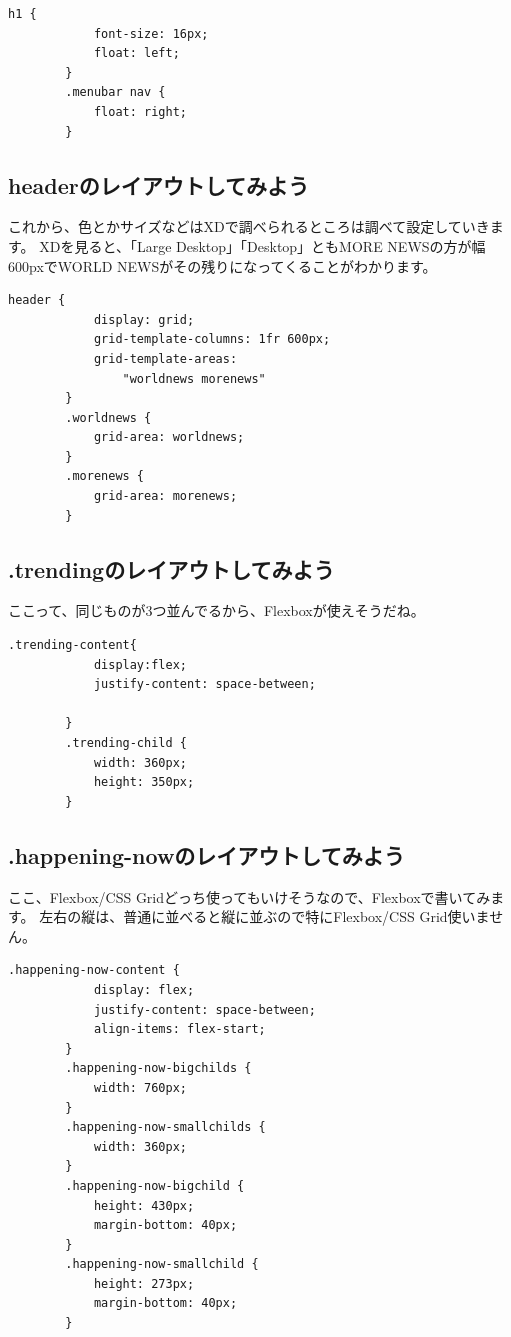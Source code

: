 \documentclass[mingoth,11pt,a4j,uplatex,dvipdfmx]{jsarticle}
\begin{document}
\begin{lstlisting}[caption=.menubarのレイアウト]
        h1 {
            font-size: 16px;
            float: left;
        }
        .menubar nav {
            float: right;
        }
\end{lstlisting}

\subsection{headerのレイアウトしてみよう}
これから、色とかサイズなどはXDで調べられるところは調べて設定していきます。
XDを見ると、「Large Desktop」「Desktop」ともMORE NEWSの方が幅600pxでWORLD NEWSがその残りになってくることがわかります。


\begin{lstlisting}[caption=headerのレイアウト]
        header {
            display: grid;
            grid-template-columns: 1fr 600px;
            grid-template-areas:
                "worldnews morenews"
        }
        .worldnews {
            grid-area: worldnews;
        }
        .morenews {
            grid-area: morenews;
        }
\end{lstlisting}

\subsection{.trendingのレイアウトしてみよう}
ここって、同じものが3つ並んでるから、Flexboxが使えそうだね。

\begin{lstlisting}[caption=.trendingのレイアウト]
        .trending-content{
            display:flex;
            justify-content: space-between;

        }
        .trending-child {
            width: 360px;
            height: 350px;
        }
\end{lstlisting}

\subsection{.happening-nowのレイアウトしてみよう}
ここ、Flexbox/CSS Gridどっち使ってもいけそうなので、Flexboxで書いてみます。
左右の縦は、普通に並べると縦に並ぶので特にFlexbox/CSS Grid使いません。

\begin{lstlisting}[caption=.happening-nowのレイアウト]
        .happening-now-content {
            display: flex;
            justify-content: space-between;
            align-items: flex-start;
        }
        .happening-now-bigchilds {
            width: 760px;
        }
        .happening-now-smallchilds {
            width: 360px;
        }
        .happening-now-bigchild {
            height: 430px;
            margin-bottom: 40px;
        }
        .happening-now-smallchild {
            height: 273px;
            margin-bottom: 40px;
        }
\end{lstlisting}
\end{document}

